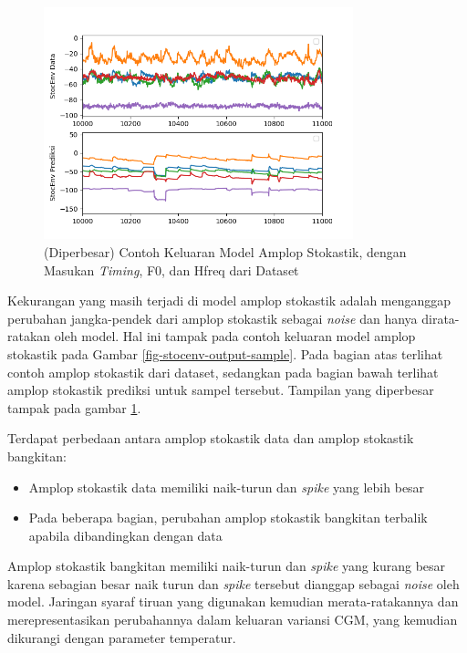 \begin{figure}[htbp]
    \centering
    \includegraphics[width=0.8\textwidth]{resources/Analisis_StocEnv_zoomed.png}
    \caption{(Diperbesar) Contoh Keluaran Model Amplop Stokastik, dengan Masukan \textit{Timing}, F0, dan Hfreq dari Dataset}\label{fig-stocenv-output-sample-zoomed}
\end{figure}

Kekurangan yang masih terjadi di model amplop stokastik adalah menganggap perubahan jangka-pendek dari amplop stokastik sebagai \textit{noise} dan hanya dirata-ratakan oleh model. Hal ini tampak pada contoh keluaran model amplop stokastik pada Gambar \ref{fig-stocenv-output-sample}. Pada bagian atas terlihat contoh amplop stokastik dari dataset, sedangkan pada bagian bawah terlihat amplop stokastik prediksi untuk sampel tersebut. Tampilan yang diperbesar tampak pada gambar \ref{fig-stocenv-output-sample-zoomed}.

Terdapat perbedaan antara amplop stokastik data dan amplop stokastik bangkitan:

\begin{itemize}
	\item Amplop stokastik data memiliki naik-turun dan \textit{spike} yang lebih besar
	\item Pada beberapa bagian, perubahan amplop stokastik bangkitan terbalik apabila dibandingkan dengan data
\end{itemize}

Amplop stokastik bangkitan memiliki naik-turun dan \textit{spike} yang kurang besar karena sebagian besar naik turun dan \textit{spike} tersebut dianggap sebagai \textit{noise} oleh model. Jaringan syaraf tiruan yang digunakan kemudian merata-ratakannya dan merepresentasikan perubahannya dalam keluaran variansi CGM, yang kemudian dikurangi dengan parameter temperatur.

